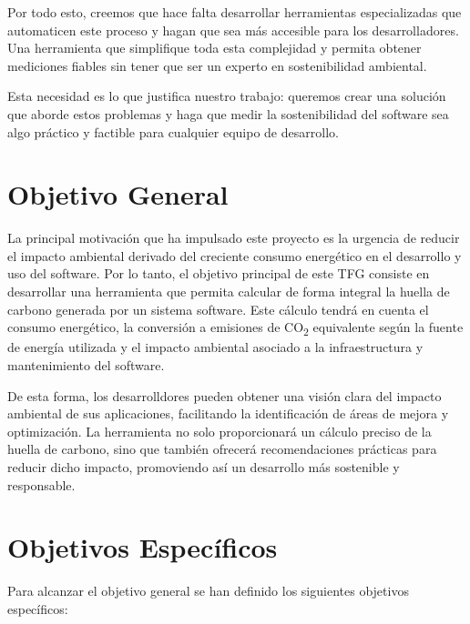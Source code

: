 \documentclass[12pt,a4paper]{report}
\begin{document}
Por todo esto, creemos que hace falta desarrollar herramientas especializadas que automaticen este proceso y hagan que sea más accesible para los desarrolladores. Una herramienta que simplifique toda esta complejidad y permita obtener mediciones fiables sin tener que ser un experto en sostenibilidad ambiental.

Esta necesidad es lo que justifica nuestro trabajo: queremos crear una solución que aborde estos problemas y haga que medir la sostenibilidad del software sea algo práctico y factible para cualquier equipo de desarrollo.

\section{Objetivo General}

La principal motivación que ha impulsado este proyecto es la urgencia de
reducir el impacto ambiental derivado del creciente consumo energético en el
desarrollo y uso del software. Por lo tanto, el objetivo principal de este TFG
consiste en desarrollar una herramienta que permita calcular de forma integral
la huella de carbono generada por un sistema software. Este cálculo tendrá en
cuenta el consumo energético, la conversión a emisiones de CO\textsubscript{2}
equivalente según la fuente de energía utilizada y el impacto ambiental
asociado a la infraestructura y mantenimiento del software.

De esta forma, los desarrolldores pueden obtener una visión clara del impacto
ambiental de sus aplicaciones, facilitando la identificación de áreas de mejora
y optimización. La herramienta no solo proporcionará un cálculo preciso de la
huella de carbono, sino que también ofrecerá recomendaciones prácticas para
reducir dicho impacto, promoviendo así un desarrollo más sostenible y
responsable.

\section{Objetivos Específicos}

Para alcanzar el objetivo general se han definido los siguientes objetivos
específicos:
\end{document}
